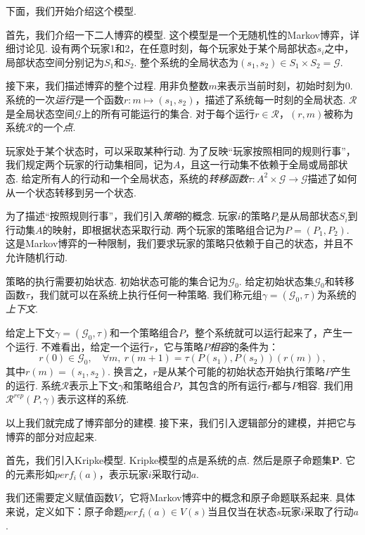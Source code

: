 下面，我们开始介绍这个模型. 

首先，我们介绍一下二人博弈的模型. 这个模型是一个无随机性的Markov博弈，详细讨论见. 设有两个玩家1和2，在任意时刻，每个玩家处于某个局部状态$s_i$之中，局部状态空间分别记为$S_1$和$S_2$. 整个系统的全局状态为$(s_1, s_2) \in S_1 \times S_2 = \mathcal{G}$. 

接下来，我们描述博弈的整个过程. 用非负整数$m$来表示当前时刻，初始时刻为$0$. 系统的一次\textit{运行}是一个函数$r: m \mapsto (s_1, s_2)$，描述了系统每一时刻的全局状态. $\mathcal{R}$是全局状态空间$\mathcal{G}$上的所有可能运行的集合. 对于每个运行$r \in \mathcal{R}$，$(r, m)$被称为系统$\mathcal{R}$的一个\textit{点}. 

玩家处于某个状态时，可以采取某种行动. 为了反映“玩家按照相同的规则行事”，我们规定两个玩家的行动集相同，记为$A$，且这一行动集不依赖于全局或局部状态. 给定所有人的行动和一个全局状态，系统的\textit{转移函数}$\tau: A^2 \times \mathcal{G} \to \mathcal{G}$描述了如何从一个状态转移到另一个状态. 

为了描述“按照规则行事”，我们引入\textit{策略}的概念. 玩家$i$的策略$P_i$是从局部状态$S_i$到行动集$A$的映射，即根据状态采取行动. 两个玩家的策略组合记为$P = (P_1, P_2)$. 这是Markov博弈的一种限制，我们要求玩家的策略只依赖于自己的状态，并且不允许随机行动. 

策略的执行需要初始状态. 初始状态可能的集合记为$\mathcal{G}_0$. 给定初始状态集$\mathcal{G}_0$和转移函数$\tau$，我们就可以在系统上执行任何一种策略. 我们称元组$\gamma = (\mathcal{G}_0, \tau)$为系统的\textit{上下文}. 

给定上下文$\gamma = (\mathcal{G}_0, \tau)$和一个策略组合$P$，整个系统就可以运行起来了，产生一个运行. 不难看出，给定一个运行$r$，它与策略$P$\textit{相容}的条件为：
\[
r(0) \in \mathcal{G}_0, \quad \forall m,\ r(m+1) = \tau(P(s_1), P(s_2))(r(m)),
\]
其中$r(m) = (s_1, s_2)$. 换言之，$r$是从某个可能的初始状态开始执行策略$P$产生的运行. 系统$\mathcal{R}$表示上下文$\gamma$和策略组合$P$，其包含的所有运行$r$都与$P$相容. 我们用$\mathcal{R}^{rep}(P, \gamma)$表示这样的系统. 

以上我们就完成了博弈部分的建模. 接下来，我们引入逻辑部分的建模，并把它与博弈的部分对应起来. 

首先，我们引入Kripke模型. Kripke模型的点是系统的点. 然后是原子命题集$\mathbf{P}$. 它的元素形如$perf_i(a)$，表示玩家$i$采取行动$a$. 

我们还需要定义赋值函数$V$，它将Markov博弈中的概念和原子命题联系起来. 具体来说，定义如下：原子命题$perf_i(a)\in V(s)$当且仅当在状态$s$玩家$i$采取了行动$a$. 

